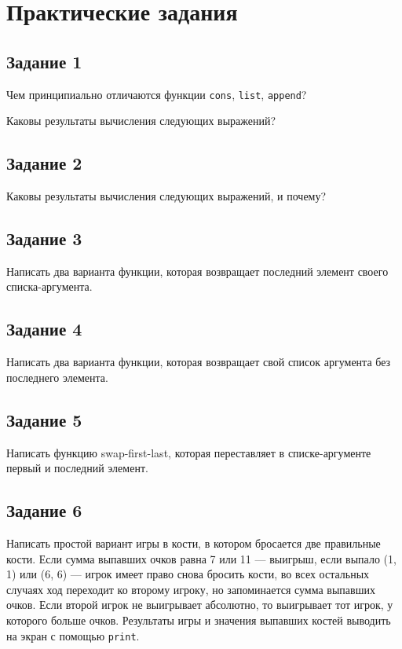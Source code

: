 \chapter{Практические задания}
%


\section{Задание 1}
Чем принципиально отличаются функции \texttt{cons}, \texttt{list},  \texttt{append}?

Каковы результаты вычисления следующих выражений?

\section{Задание 2}
Каковы результаты вычисления следующих выражений, и почему?

\section{Задание 3}
Написать два варианта функции, которая возвращает последний элемент своего списка-аргумента.

\section{Задание 4}
Написать два варианта функции, которая возвращает свой список аргумента без последнего элемента.

\section{Задание 5}
Написать функцию swap-first-last, которая переставляет в списке-аргументе первый и последний элемент.

\section{Задание 6}
Написать простой вариант игры в кости, в котором бросается две правильные кости. Если сумма выпавших очков равна 7 или 11 --- выигрыш, если выпало (1, 1) или (6, 6) --- игрок имеет право снова бросить кости, во всех остальных случаях ход переходит ко второму игроку, но запоминается сумма выпавших очков. Если второй игрок не выигрывает абсолютно, то выигрывает тот игрок, у которого больше очков. Результаты игры и значения выпавших костей выводить на экран с помощью \texttt{print}.

